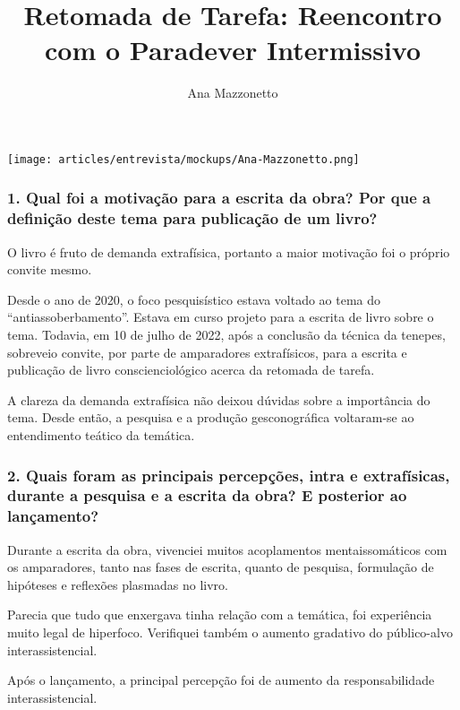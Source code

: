 \documentclass{gescons}
\author{Ana Mazzonetto}
\title{Retomada de Tarefa: Reencontro com o Paradever Intermissivo}
\begin{document}
    \makeentrevistatitle


    \begin{multicols}{2}


\begin{center}

    \texttt{[image: articles/entrevista/mockups/Ana-Mazzonetto.png]}
\end{center}

\subsubsection{1. Qual foi a motivação para a escrita da obra? Por que a definição deste tema para publicação de um livro?}

O livro é fruto de demanda extrafísica, portanto a maior motivação foi o próprio convite mesmo. 

Desde o ano de 2020, o foco pesquisístico estava voltado ao tema do “antiassoberbamento”. Estava em curso projeto para a escrita de livro sobre o tema. Todavia, em 10 de julho de 2022, após a conclusão da técnica da tenepes, sobreveio convite, por parte de amparadores extrafísicos, para a escrita e publicação de livro conscienciológico acerca da retomada de tarefa. 

A clareza da demanda extrafísica não deixou dúvidas sobre a importância do tema. Desde então, a pesquisa e a produção gesconográfica voltaram-se ao entendimento teático da temática.

\subsubsection{2. Quais foram as principais percepções, intra e extrafísicas, durante a pesquisa e a escrita da obra? E posterior ao lançamento?}

Durante a escrita da obra, vivenciei muitos acoplamentos mentaissomáticos com os amparadores, tanto nas fases de escrita, quanto de pesquisa, formulação de hipóteses e reflexões plasmadas no livro. 

Parecia que tudo que enxergava tinha relação com a temática, foi experiência muito legal de hiperfoco. Verifiquei também o aumento gradativo do público-alvo interassistencial.

Após o lançamento, a principal percepção foi de aumento da responsabilidade interassistencial. 


\end{multicols}
\end{document}
